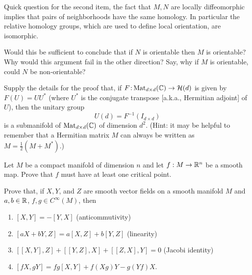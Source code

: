 \documentclass[12pt]{memoir}
\def\co{\colon}
\newcommand{\from}{\co\!\!}
\begin{document}
   Quick question for the second item, the fact that $M,N$ are locally diffeomorphic implies that pairs of neighborhoods have the same homology. In particular the relative homology groups, which are used to define local orientation, are isomorphic.

   \begin{significant}
    Would this be sufficient to conclude that if $N$ is orientable then $M$ is orientable? Why would this argument fail in the other direction? Say, why if $M$ is orientable, could $N$ be non-orientable?
   \end{significant}

   \begin{Ej}
    Supply the details for the proof that, if $F \from \operatorname{Mat}_{d \times d}(\bC) \to \cH(d)$ is given by $F(U) = UU^*$ (where $U^*$ is the conjugate transpose [a.k.a., Hermitian adjoint] of $U$), then the unitary group
	\[
		U(d) = F^{-1}(I_{d \times d})
	\]
	is a submanifold of $\operatorname{Mat}_{d \times d}(\mathbb{C})$ of dimension $d^2$. (Hint: it may be helpful to remember that a Hermitian matrix $M$ can always be written as $M = \frac{1}{2}(M + M^*)$.)
   \end{Ej}

   \begin{Ej}
    Let $M$ be a compact manifold of dimension $n$ and let $f:M \to \mathbb{R}^n$ be a smooth map. Prove that $f$ must have at least one critical point.
   \end{Ej}

   \begin{Ej}
    Prove that, if $X, Y$, and $Z$ are smooth vector fields on a smooth manifold $M$ and $a,b \in \mathbb{R}$, $f,g \in C^\infty (M)$, then
	\begin{enumerate}
		\item $[X,Y] = -[Y,X]$ (anticommutivity)
		\item $[aX+bY,Z] = a[X,Z]+b[Y,Z]$ (linearity)
		\item $[[X,Y],Z] + [[Y,Z],X] + [[Z,X],Y] = 0$ (Jacobi identity)
		\item $[fX,gY] = fg[X,Y] + f(Xg)Y - g(Yf)X$.
	\end{enumerate}
   \end{Ej}
   
\end{document}
